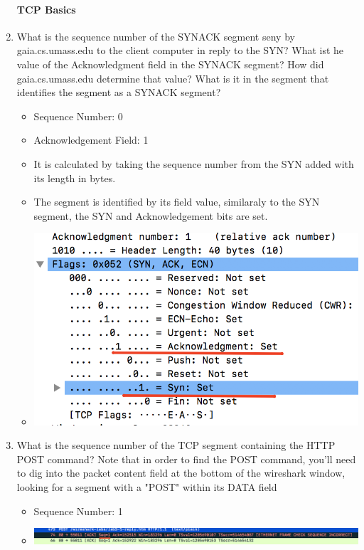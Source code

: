 \documentclass{article}
\begin{document}
\begin{enumerate}
    \paragraph{TCP Basics}
    \item What is the sequence number of the SYNACK segment seny by gaia.cs.umass.edu to the client computer in reply to the SYN?  What ist he value of the Acknowledgment field in the SYNACK segment?  How did 
    gaia.cs.umass.edu determine that value?  What is it in the segment that identifies the segment as a SYNACK segment?
        \begin{itemize}
          \item Sequence Number: 0
          \item Acknowledgement Field: 1
          \item It is calculated by taking the sequence number from the SYN added with its length in bytes.
          \item The segment is identified by its field value, similaraly to the SYN segment, the SYN and Acknowledgement bits are set.
          \item \includegraphics[scale=0.5]{images/TCP5.png}
        \end{itemize}

    \item What is the sequence number of the TCP segment containing the HTTP POST command?  Note that in order to find the POST command, you'll need to dig into the packet content field at the bottom 
    of the wireshark window, looking for a segment with a "POST" within its DATA field
        \begin{itemize}
          \item Sequence Number: 1
          \item \includegraphics[scale=0.5]{images/TCP6.png}
        \end{itemize}


\end{enumerate}
\end{document}
